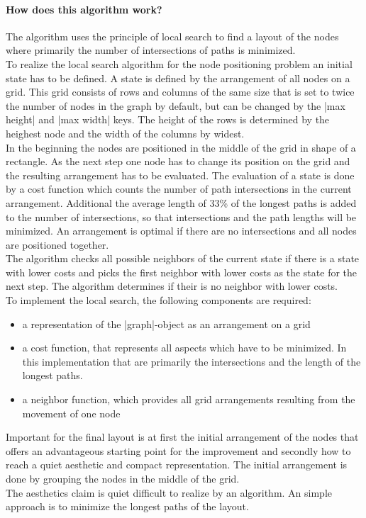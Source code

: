 \paragraph{How does this algorithm work?}
The algorithm uses the principle of local search to find a layout of the nodes where primarily the number of intersections of paths is minimized.\\ To realize the local search algorithm for the node positioning problem an initial state has to be defined. A state is defined by the arrangement of all nodes on a grid. This grid consists of rows and columns of the same size that is set to twice the number of nodes in the graph by default, but can be changed by the |max height| and |max width| keys. The height of the rows is determined by the heighest node and the width of the columns by widest.
\\ In the beginning the nodes are positioned in the middle of the grid in shape of a rectangle. As the next step one node has to change its position on the grid and the resulting arrangement has to be evaluated. The evaluation of a state is done by a cost function which counts the number of path intersections in the current arrangement. Additional the average length of 33\% of the longest paths is added to the number of intersections, so that intersections and the path lengths will be minimized. An arrangement is optimal if there are no intersections and all nodes are positioned together. 
\\ The algorithm checks all possible neighbors of the current state if there is a state with lower costs and picks the first neighbor with lower costs as the state for the next step. The algorithm determines if their is no neighbor with lower costs.
\\ To implement the local search, the following components are required:
\begin{itemize}
\item a representation of the |graph|-object as an arrangement on a grid
\item a cost function, that represents all aspects which have to be minimized. In this implementation that are primarily the intersections and the length of the longest paths.
\item a neighbor function, which provides all grid arrangements resulting from the movement of one node
\end{itemize}
Important for the final layout is at first the initial arrangement of the nodes that offers an advantageous starting point for the improvement and secondly how to reach a quiet aesthetic and compact representation. The initial arrangement is done by grouping the nodes in the middle of the grid.
\\ The aesthetics claim is quiet difficult to realize by an algorithm. An simple approach is to minimize the longest paths of the layout.

